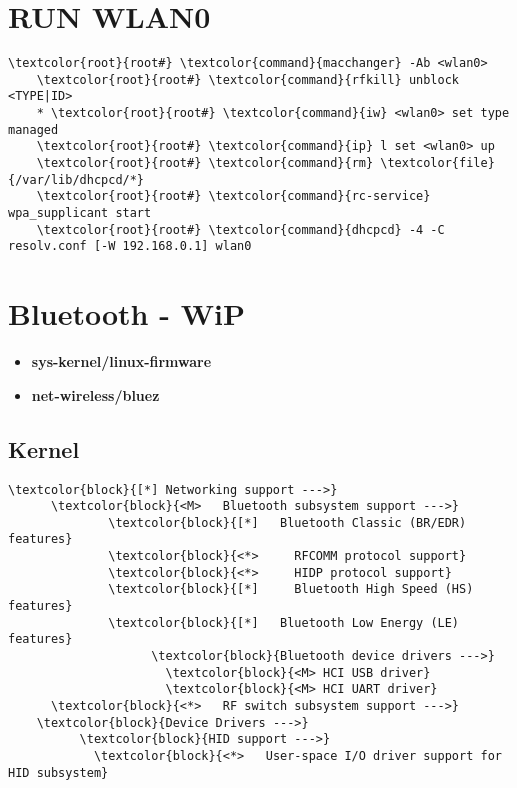 \documentclass[10pt, a4paper, onecolumn, openany]{book}         %
\begin{document}
\section{RUN WLAN0}
\begin{Verbatim}[commandchars=\\\{\}]
    \textcolor{root}{root#} \textcolor{command}{macchanger} -Ab <wlan0>
    \textcolor{root}{root#} \textcolor{command}{rfkill} unblock <TYPE|ID>
    * \textcolor{root}{root#} \textcolor{command}{iw} <wlan0> set type managed
    \textcolor{root}{root#} \textcolor{command}{ip} l set <wlan0> up
    \textcolor{root}{root#} \textcolor{command}{rm} \textcolor{file}{/var/lib/dhcpcd/*}
    \textcolor{root}{root#} \textcolor{command}{rc-service} wpa_supplicant start
    \textcolor{root}{root#} \textcolor{command}{dhcpcd} -4 -C resolv.conf [-W 192.168.0.1] wlan0
\end{Verbatim}



\section{Bluetooth - WiP}
\begin{itemize}
    \item \textbf{sys-kernel/linux-firmware}
    \item \textbf{net-wireless/bluez}
\end{itemize}
\subsection{Kernel}
\begin{Verbatim}[commandchars=\\\{\}]
\textcolor{block}{[*] Networking support --->}
      \textcolor{block}{<M>   Bluetooth subsystem support --->}
              \textcolor{block}{[*]   Bluetooth Classic (BR/EDR) features}
              \textcolor{block}{<*>     RFCOMM protocol support}
              \textcolor{block}{<*>     HIDP protocol support}
              \textcolor{block}{[*]     Bluetooth High Speed (HS) features}
              \textcolor{block}{[*]   Bluetooth Low Energy (LE) features}
                    \textcolor{block}{Bluetooth device drivers --->}
                      \textcolor{block}{<M> HCI USB driver}
                      \textcolor{block}{<M> HCI UART driver}
      \textcolor{block}{<*>   RF switch subsystem support --->}
    \textcolor{block}{Device Drivers --->}
          \textcolor{block}{HID support --->}
            \textcolor{block}{<*>   User-space I/O driver support for HID subsystem}
\end{Verbatim}
\end{document}
